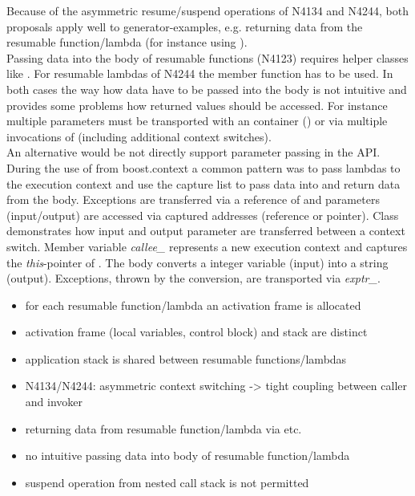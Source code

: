 Because of the asymmetric resume/suspend operations of N4134 and N4244, both
proposals apply well to generator-examples, e.g. returning data from the
resumable function/lambda (for instance using \yield).\\
Passing data into the body of resumable functions (N4123) requires helper
classes like \channel.
For resumable lambdas of N4244 the member function \rlwanted has to be used.
In both cases the way how data have to be passed into the body is not intuitive
and provides some problems how returned values should be accessed. For instance
multiple parameters must be transported with an container (\tuple) or via
multiple invocations of \rlwanted (including additional context switches).\\
\newline
An alternative would be not directly support parameter passing in the API.\\
During the use of  from boost.context\cite{bcontext} a
common pattern was to pass lambdas to the execution context and use the capture
list to pass data into and return data from the body. Exceptions are transferred
via a reference of \excpt and parameters (input/output) are accessed via
captured addresses (reference or pointer).
Class  demonstrates how input and output parameter are transferred
between a context switch. Member variable \textit{callee\_} represents a new
execution context and captures the \textit{this}-pointer of . The body
converts a integer variable (input) into a string (output). Exceptions, thrown
by the conversion, are transported via \textit{exptr\_}.

\begin{itemize}
    \item   for each resumable function/lambda an activation frame is allocated
    \item   activation frame (local variables, control block) and stack are
            distinct
    \item   application stack is shared between resumable functions/lambdas
    \item   N4134/N4244: asymmetric context switching -> tight coupling between
            caller and invoker
    \item   returning data from resumable function/lambda via \yield etc.
    \item   no intuitive passing data into body of resumable function/lambda
    \item   suspend operation from nested call stack is not permitted
\end{itemize}

